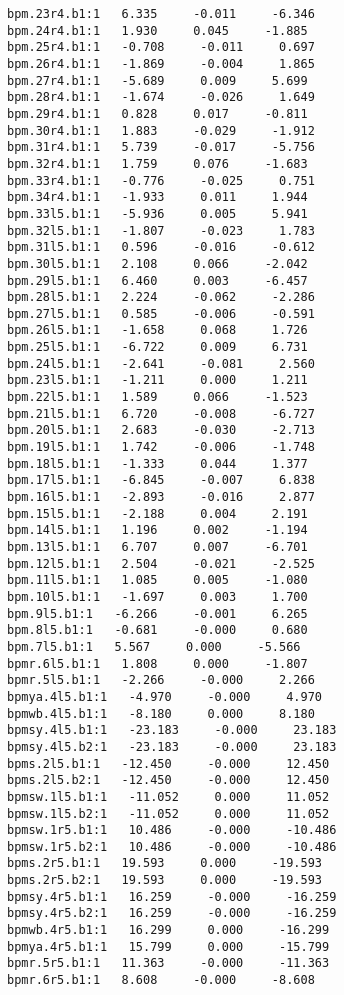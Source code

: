 \begin{verbatim}
bpm.23r4.b1:1   6.335     -0.011     -6.346
bpm.24r4.b1:1   1.930     0.045     -1.885
bpm.25r4.b1:1   -0.708     -0.011     0.697
bpm.26r4.b1:1   -1.869     -0.004     1.865
bpm.27r4.b1:1   -5.689     0.009     5.699
bpm.28r4.b1:1   -1.674     -0.026     1.649
bpm.29r4.b1:1   0.828     0.017     -0.811
bpm.30r4.b1:1   1.883     -0.029     -1.912
bpm.31r4.b1:1   5.739     -0.017     -5.756
bpm.32r4.b1:1   1.759     0.076     -1.683
bpm.33r4.b1:1   -0.776     -0.025     0.751
bpm.34r4.b1:1   -1.933     0.011     1.944
bpm.33l5.b1:1   -5.936     0.005     5.941
bpm.32l5.b1:1   -1.807     -0.023     1.783
bpm.31l5.b1:1   0.596     -0.016     -0.612
bpm.30l5.b1:1   2.108     0.066     -2.042
bpm.29l5.b1:1   6.460     0.003     -6.457
bpm.28l5.b1:1   2.224     -0.062     -2.286
bpm.27l5.b1:1   0.585     -0.006     -0.591
bpm.26l5.b1:1   -1.658     0.068     1.726
bpm.25l5.b1:1   -6.722     0.009     6.731
bpm.24l5.b1:1   -2.641     -0.081     2.560
bpm.23l5.b1:1   -1.211     0.000     1.211
bpm.22l5.b1:1   1.589     0.066     -1.523
bpm.21l5.b1:1   6.720     -0.008     -6.727
bpm.20l5.b1:1   2.683     -0.030     -2.713
bpm.19l5.b1:1   1.742     -0.006     -1.748
bpm.18l5.b1:1   -1.333     0.044     1.377
bpm.17l5.b1:1   -6.845     -0.007     6.838
bpm.16l5.b1:1   -2.893     -0.016     2.877
bpm.15l5.b1:1   -2.188     0.004     2.191
bpm.14l5.b1:1   1.196     0.002     -1.194
bpm.13l5.b1:1   6.707     0.007     -6.701
bpm.12l5.b1:1   2.504     -0.021     -2.525
bpm.11l5.b1:1   1.085     0.005     -1.080
bpm.10l5.b1:1   -1.697     0.003     1.700
bpm.9l5.b1:1   -6.266     -0.001     6.265
bpm.8l5.b1:1   -0.681     -0.000     0.680
bpm.7l5.b1:1   5.567     0.000     -5.566
bpmr.6l5.b1:1   1.808     0.000     -1.807
bpmr.5l5.b1:1   -2.266     -0.000     2.266
bpmya.4l5.b1:1   -4.970     -0.000     4.970
bpmwb.4l5.b1:1   -8.180     0.000     8.180
bpmsy.4l5.b1:1   -23.183     -0.000     23.183
bpmsy.4l5.b2:1   -23.183     -0.000     23.183
bpms.2l5.b1:1   -12.450     -0.000     12.450
bpms.2l5.b2:1   -12.450     -0.000     12.450
bpmsw.1l5.b1:1   -11.052     0.000     11.052
bpmsw.1l5.b2:1   -11.052     0.000     11.052
bpmsw.1r5.b1:1   10.486     -0.000     -10.486
bpmsw.1r5.b2:1   10.486     -0.000     -10.486
bpms.2r5.b1:1   19.593     0.000     -19.593
bpms.2r5.b2:1   19.593     0.000     -19.593
bpmsy.4r5.b1:1   16.259     -0.000     -16.259
bpmsy.4r5.b2:1   16.259     -0.000     -16.259
bpmwb.4r5.b1:1   16.299     0.000     -16.299
bpmya.4r5.b1:1   15.799     0.000     -15.799
bpmr.5r5.b1:1   11.363     -0.000     -11.363
bpmr.6r5.b1:1   8.608     -0.000     -8.608

\end{verbatim}
